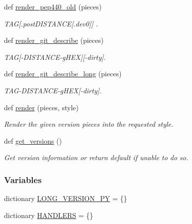 \begin{DoxyCompactItemize}
def \hyperlink{namespacesrc_1_1__version_a04e18593f1d130a8f2609ebb4520faf3}{render\+\_\+pep440\+\_\+old} (pieces)
\begin{DoxyCompactList}\small\item\em T\+AG\mbox{[}.post\+D\+I\+S\+T\+A\+N\+CE\mbox{[}.dev0\mbox{]}\mbox{]} . \end{DoxyCompactList}\item 
def \hyperlink{namespacesrc_1_1__version_afab0479c00019cd66c0000ffb3fcba2f}{render\+\_\+git\+\_\+describe} (pieces)
\begin{DoxyCompactList}\small\item\em T\+AG\mbox{[}-\/\+D\+I\+S\+T\+A\+N\+C\+E-\/g\+H\+EX\mbox{]}\mbox{[}-\/dirty\mbox{]}. \end{DoxyCompactList}\item 
def \hyperlink{namespacesrc_1_1__version_aefa841fcd557dd2ff3594846803f1e58}{render\+\_\+git\+\_\+describe\+\_\+long} (pieces)
\begin{DoxyCompactList}\small\item\em T\+A\+G-\/\+D\+I\+S\+T\+A\+N\+C\+E-\/g\+H\+EX\mbox{[}-\/dirty\mbox{]}. \end{DoxyCompactList}\item 
def \hyperlink{namespacesrc_1_1__version_a993e064384f8f9986d0ef6f48f7e967c}{render} (pieces, style)
\begin{DoxyCompactList}\small\item\em Render the given version pieces into the requested style. \end{DoxyCompactList}\item 
def \hyperlink{namespacesrc_1_1__version_ab09491ecacc235eeaa4a2e433ce17977}{get\+\_\+versions} ()
\begin{DoxyCompactList}\small\item\em Get version information or return default if unable to do so. \end{DoxyCompactList}\end{DoxyCompactItemize}
\subsubsection*{Variables}
\begin{DoxyCompactItemize}
\item 
dictionary \hyperlink{namespacesrc_1_1__version_afa1acce20123f2e96e51dce215e94f39}{L\+O\+N\+G\+\_\+\+V\+E\+R\+S\+I\+O\+N\+\_\+\+PY} = \{\}
\item 
dictionary \hyperlink{namespacesrc_1_1__version_afc5a37c61f1815d00f27cf37fa2a08c6}{H\+A\+N\+D\+L\+E\+RS} = \{\}
\end{DoxyCompactItemize}


